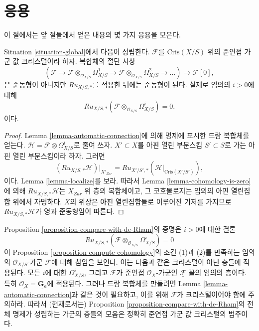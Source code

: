 \section{응용}
\label{section-applications}

\noindent
이 절에서는 앞 절들에서 얻은 내용의 몇 가지 응용을 모은다.

\begin{proposition}
\label{proposition-compare-with-de-Rham}
Situation \ref{situation-global}에서 다음이 성립한다.
$\mathcal{F}$를 $\text{Cris}(X/S)$ 위의 준연접 가군 값
크리스털이라 하자. 복합체의 절단 사상
$$
(\mathcal{F} \to
\mathcal{F} \otimes_{\mathcal{O}_{X/S}} \Omega^1_{X/S} \to
\mathcal{F} \otimes_{\mathcal{O}_{X/S}} \Omega^2_{X/S} \to \ldots)
\longrightarrow \mathcal{F}[0],
$$
은 준동형이 아니지만 $Ru_{X/S, *}$를 적용한 뒤에는 준동형이 된다.
실제로 임의의 $i > 0$에 대해
$$
Ru_{X/S, *}(\mathcal{F} \otimes_{\mathcal{O}_{X/S}} \Omega^i_{X/S}) = 0.
$$
이다.
\end{proposition}

\begin{proof}
Lemma \ref{lemma-automatic-connection}에 의해 명제에 표시한 드람
복합체를 얻는다. $\mathcal{H} = \mathcal{F} \otimes \Omega^i_{X/S}$로
줄여 쓰자. $X' \subset X$를 아핀 열린 부분스킴
$S' \subset S$로 가는 아핀 열린 부분스킴이라 하자. 그러면
$$
(Ru_{X/S, *}\mathcal{H})|_{X'_{Zar}} =
Ru_{X'/S', *}(\mathcal{H}|_{\text{Cris}(X'/S')}),
$$
이다. Lemma \ref{lemma-localize}를 보라. 따라서 Lemma
\ref{lemma-cohomology-is-zero}에 의해 $Ru_{X/S, *}\mathcal{H}$는
$X_{Zar}$ 위 층의 복합체이고, 그 코호몰로지는 임의의 아핀
열린집합 위에서 자명하다. $X$의 위상은 아핀 열린집합들로 이루어진
기저를 가지므로 $Ru_{X/S, *}\mathcal{H}$가 영과 준동형임이 따른다.
\end{proof}

\begin{remark}
\label{remark-vanishing}
Proposition \ref{proposition-compare-with-de-Rham}의 증명은 $i > 0$에
대한 결론
$$
Ru_{X/S, *}(\mathcal{F} \otimes_{\mathcal{O}_{X/S}} \Omega^i_{X/S}) = 0
$$
이 Proposition \ref{proposition-compute-cohomology}의 조건 (1)과
(2)를 만족하는 임의의 $\mathcal{O}_{X/S}$-가군 $\mathcal{F}$에
대해 참임을 보인다. 이는 다음과 같은 크리스털이 아닌 층들에
적용된다. 모든 $i$에 대한 $\Omega^i_{X/S}$, 그리고
$\mathcal{F}$가 준연접 $\mathcal{O}_X$-가군인
$\underline{\mathcal{F}}$ 꼴의 임의의 층이다. 특히
$\underline{\mathcal{O}_X} = \underline{\mathbf{G}_a}$에 적용된다.
그러나 드람 복합체를 만들려면 Lemma
\ref{lemma-automatic-connection}과 같은 것이 필요하고, 이를 위해
$\mathcal{F}$가 크리스털이어야 함에 주의하라. 따라서 (현재로서는)
Proposition \ref{proposition-compare-with-de-Rham}의 전체 명제가
성립하는 가군의 층들의 모음은 정확히 준연접 가군 값 크리스털의
범주이다.
\end{remark}

